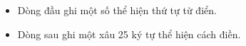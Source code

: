 \begin{itemize}
	\item Dòng đầu ghi một số thể hiện thứ tự từ điển.
	\item Dòng sau ghi một xâu 25 ký tự thể hiện cách điền.
\end{itemize}